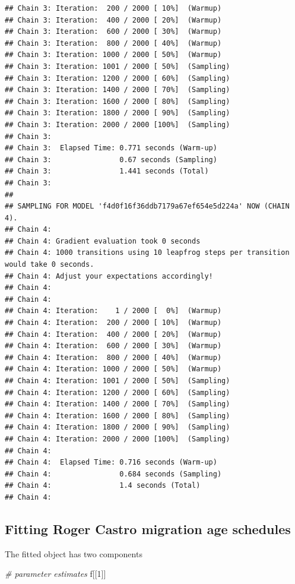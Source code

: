 \documentclass[
]{book}
\newenvironment{Shaded}{\begin{snugshade}}{\end{snugshade}}
\newcommand{\CommentTok}[1]{\textcolor[rgb]{0.56,0.35,0.01}{\textit{#1}}}
\newcommand{\DecValTok}[1]{\textcolor[rgb]{0.00,0.00,0.81}{#1}}
\newcommand{\NormalTok}[1]{#1}
\begin{document}
\begin{verbatim}
## Chain 3: Iteration:  200 / 2000 [ 10%]  (Warmup)
## Chain 3: Iteration:  400 / 2000 [ 20%]  (Warmup)
## Chain 3: Iteration:  600 / 2000 [ 30%]  (Warmup)
## Chain 3: Iteration:  800 / 2000 [ 40%]  (Warmup)
## Chain 3: Iteration: 1000 / 2000 [ 50%]  (Warmup)
## Chain 3: Iteration: 1001 / 2000 [ 50%]  (Sampling)
## Chain 3: Iteration: 1200 / 2000 [ 60%]  (Sampling)
## Chain 3: Iteration: 1400 / 2000 [ 70%]  (Sampling)
## Chain 3: Iteration: 1600 / 2000 [ 80%]  (Sampling)
## Chain 3: Iteration: 1800 / 2000 [ 90%]  (Sampling)
## Chain 3: Iteration: 2000 / 2000 [100%]  (Sampling)
## Chain 3: 
## Chain 3:  Elapsed Time: 0.771 seconds (Warm-up)
## Chain 3:                0.67 seconds (Sampling)
## Chain 3:                1.441 seconds (Total)
## Chain 3: 
## 
## SAMPLING FOR MODEL 'f4d0f16f36ddb7179a67ef654e5d224a' NOW (CHAIN 4).
## Chain 4: 
## Chain 4: Gradient evaluation took 0 seconds
## Chain 4: 1000 transitions using 10 leapfrog steps per transition would take 0 seconds.
## Chain 4: Adjust your expectations accordingly!
## Chain 4: 
## Chain 4: 
## Chain 4: Iteration:    1 / 2000 [  0%]  (Warmup)
## Chain 4: Iteration:  200 / 2000 [ 10%]  (Warmup)
## Chain 4: Iteration:  400 / 2000 [ 20%]  (Warmup)
## Chain 4: Iteration:  600 / 2000 [ 30%]  (Warmup)
## Chain 4: Iteration:  800 / 2000 [ 40%]  (Warmup)
## Chain 4: Iteration: 1000 / 2000 [ 50%]  (Warmup)
## Chain 4: Iteration: 1001 / 2000 [ 50%]  (Sampling)
## Chain 4: Iteration: 1200 / 2000 [ 60%]  (Sampling)
## Chain 4: Iteration: 1400 / 2000 [ 70%]  (Sampling)
## Chain 4: Iteration: 1600 / 2000 [ 80%]  (Sampling)
## Chain 4: Iteration: 1800 / 2000 [ 90%]  (Sampling)
## Chain 4: Iteration: 2000 / 2000 [100%]  (Sampling)
## Chain 4: 
## Chain 4:  Elapsed Time: 0.716 seconds (Warm-up)
## Chain 4:                0.684 seconds (Sampling)
## Chain 4:                1.4 seconds (Total)
## Chain 4:
\end{verbatim}

\hypertarget{fitting-roger-castro-migration-age-schedules-3}{%
\subsection{Fitting Roger Castro migration age schedules}\label{fitting-roger-castro-migration-age-schedules-3}}

The fitted object has two components

\begin{Shaded}
\begin{Highlighting}[]
\CommentTok{\# parameter estimates}
\NormalTok{f[[}\DecValTok{1}\NormalTok{]]}
\end{Highlighting}
\end{Shaded}
\end{document}
